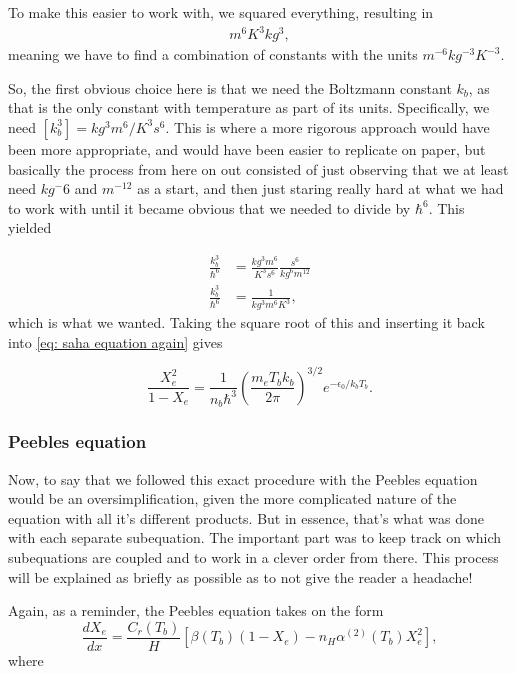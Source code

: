 \documentclass[12pt]{article}
\begin{document}
To make this easier to work with, we squared everything, resulting in
\begin{align}
m^6K^3kg^3,
\end{align}
meaning we have to find a combination of constants with the units $m^{-6}kg^{-3}K^{-3}$.

So, the first obvious choice here is that we need the Boltzmann constant $k_b$, as that is the only constant with temperature as part of its units. Specifically, we need $[k_b^3] = kg^3m^6/K^3s^6$. This is where a more rigorous approach would have been more appropriate, and would have been easier to replicate on paper, but basically the process from here on out consisted of just observing that we at least need $kg^-{6}$ and $m^{-12}$ as a start, and then just staring really hard at what we had to work with until it became obvious that we needed to divide by $\hbar^6$. This yielded 

\begin{align}
    \frac{k_b^3}{\hbar^6} &= \frac{kg^3m^6}{K^3s^6} \frac{s^6}{kg^6m^{12}} \\
    \frac{k_b^3}{\hbar^6} &= \frac{1}{kg^3m^6K^3},
\end{align} 
which is what we wanted. Taking the square root of this and inserting it back into \cref{eq: saha equation again} gives

\begin{equation}\label{eq: final saha equation}
    \frac{X_{e}^{2}}{1-X_{e}}=\frac{1}{n_{b}\hbar^3}\left(\frac{m_{e} T_{b}k_b}{2 \pi}\right)^{3 / 2} e^{-\epsilon_{0} /k_b T_{b}}.
\end{equation}


\subsubsection{Peebles equation}
Now, to say that we followed this exact procedure with the Peebles equation would be an oversimplification, given the more complicated nature of the equation with all it's different products. But in essence, that's what was done with each separate subequation. The important part was to keep track on which subequations are coupled and to work in a clever order from there. This process will be explained as briefly as possible as to not give the reader a headache! 

Again, as a reminder, the Peebles equation takes on the form 
\begin{equation}\label{eq: peebles equation again}
    \frac{d X_{e}}{d x}=\frac{C_{r}\left(T_{b}\right)}{H}\left[\beta\left(T_{b}\right)\left(1-X_{e}\right)-n_{H} \alpha^{(2)}\left(T_{b}\right) X_{e}^{2}\right],
\end{equation}
where
\end{document}
